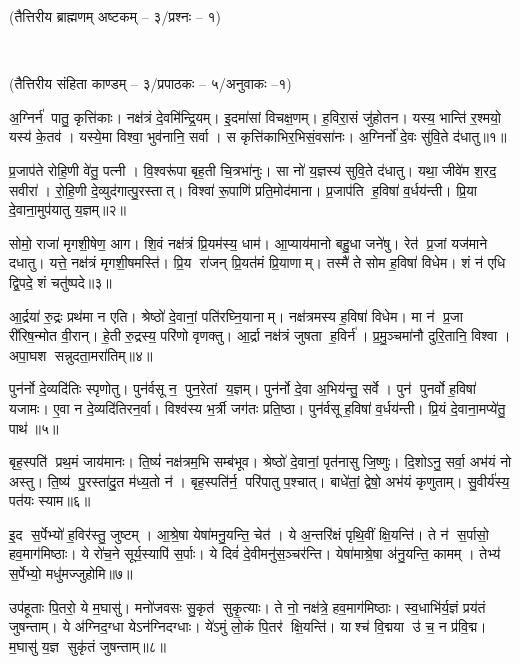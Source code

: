
\centerline{\normalsize(तैत्तिरीय ब्राह्मणम् अष्टकम् -- ३/प्रश्नः -- १)}\mbox{}\\[-2em]
\centerline{\normalsize(तैत्तिरीय संहिता काण्डम् -- ३/प्रपाठकः -- ५/अनुवाकः --१)}

अ॒ग्निर्न॑ पातु॒ कृत्ति॑काः। नक्ष॑त्रं दे॒वमि॑न्द्रि॒यम्। इ॒दमा॑सां विचक्ष॒णम्। ह॒विरा॒सं जु॑होतन। यस्य॒ भान्ति॑ र॒श्मयो॒ यस्य॑ के॒तव॑। यस्ये॒मा विश्वा॒ भुव॑नानि॒ सर्वा। स कृत्ति॑काभि\-र॒भिसं॒वसा॑नः। अ॒ग्निर्नो॑ दे॒वः सु॑वि॒ते द॑धातु॥१॥ 

प्र॒जाप॑ते रोहि॒णी वे॑तु॒ पत्नी। वि॒श्वरू॑पा बृह॒ती चि॒त्रभा॑नुः। सा नो॑ य॒ज्ञस्य॑ सुवि॒ते द॑धातु। यथा॒ जीवे॑म श॒रद॒ सवीरा॑। रो॒हि॒णी दे॒व्युद॑गात्पु॒रस्तात्। विश्वा॑ रू॒पाणि॑ प्रति॒मोद॑माना। प्र॒जाप॑ति ह॒विषा॑ व॒र्धय॑न्ती। प्रि॒या दे॒वाना॒मुप॑यातु य॒ज्ञम्॥२॥ 

सोमो॒ राजा॑ मृगशी॒\ar{}षेण॒ आग\snn{}। शि॒वं नक्ष॑त्रं प्रि॒यम॑स्य॒ धाम॑। आ॒प्याय॑मानो बहु॒धा जने॑षु। रेत॑ प्र॒जां यज॑माने दधातु। यत्ते॒ नक्ष॑त्रं मृगशी॒\ar{}षमस्ति॑। प्रि॒य रा॑जन् प्रि॒यत॑मं प्रि॒याणाम्। तस्मै॑ ते सोम ह॒विषा॑ विधेम। शं न॑ एधि द्वि॒पदे॒ शं चतु॑ष्पदे॥३॥ 

आ॒र्द्रया॑ रु॒द्रः प्रथ॑मा न एति। श्रेष्ठो॑ दे॒वानां॒ पति॑रघ्नि॒यानाम्। नक्ष॑त्रमस्य ह॒विषा॑ विधेम। मा न॑ प्र॒जा री॑रिष॒न्मोत वी॒रान्। हे॒ती रु॒द्रस्य॒ परि॑णो वृणक्तु। आ॒र्द्रा नक्ष॑त्रं जुषता ह॒विर्न॑। प्र॒मु॒ञ्चमा॑नौ दुरि॒तानि॒ विश्वा। अपा॒घश सन्नुदता॒मरा॑तिम्॥४॥ 

पुन॑र्नो दे॒व्यदि॑तिः स्पृणोतु। पुन॑र्वसू न॒ पुन॒रेतां य॒ज्ञम्। पुन॑र्नो दे॒वा अ॒भिय॑न्तु॒ सर्वे। पुन॑ पुनर्वो ह॒विषा॑ यजामः। ए॒वा न दे॒व्यदि॑तिरन॒र्वा। विश्व॑स्य भ॒र्त्री जग॑तः प्रति॒ष्ठा। पुन॑र्वसू ह॒विषा॑ व॒र्धय॑न्ती। प्रि॒यं दे॒वाना॒मप्ये॑तु॒ पाथ॑॥५॥ 

बृह॒स्पति॑ प्रथ॒मं जाय॑मानः। ति॒ष्यं॑ नक्ष॑त्रम॒भि सम्ब॑भूव। श्रेष्ठो॑ दे॒वानां॒ पृत॑नासु  जि॒ष्णुः। दि॒शोऽनु॒ सर्वा॒ अभ॑यं नो अस्तु। ति॒ष्य॑ पु॒रस्ता॑दु॒त म॑ध्य॒तो न॑। बृह॒स्पति॑र्न॒ परि॑पातु प॒श्चात्। बाधे॑तां॒ द्वेषो॒ अभ॑यं कृणुताम्। सु॒वीर्य॑स्य॒ पत॑यः स्याम॥६॥ 

इ॒द स॒र्पेभ्यो॑ ह॒विर॑स्तु॒ जुष्टम्। आ॒श्रे॒षा येषा॑मनु॒यन्ति॒ चेत॑। ये अ॒न्तरि॑क्षं पृथि॒वीं क्षि॒यन्ति॑। ते न॑ स॒र्पासो॒ हव॒माग॑मिष्ठाः। ये रो॑च॒ने सूर्य॒स्यापि॑ स॒र्पाः। ये दिवं॑ दे॒वीमनु॑स॒ञ्चर॑न्ति। येषा॑माश्रे॒षा अ॑नु॒यन्ति॒ कामम्। तेभ्य॑ स॒र्पेभ्यो॒ मधु॑मज्जुहोमि॥७॥ 

उप॑हूताः पि॒तरो॒ ये म॒घासु॑। मनो॑जवसः सु॒कृत॑ सुकृ॒त्याः। ते नो॒ नक्ष॑त्रे॒ हव॒माग॑मिष्ठाः। स्व॒धाभि॑र्य॒ज्ञं प्रय॑तं जुषन्ताम्। ये अ॑ग्निद॒ग्धा येऽन॑ग्निदग्धाः। ये॑ऽमुं लो॒कं पि॒तर॑ क्षि॒यन्ति॑। याश्च॑ वि॒द्मया उ॑ च॒ न प्र॑वि॒द्म। म॒घासु॑ य॒ज्ञ सुकृ॑तं जुषन्ताम्॥८॥ 

